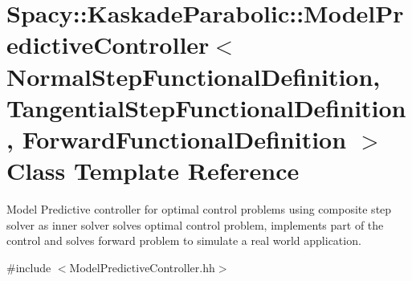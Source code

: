 \hypertarget{classSpacy_1_1KaskadeParabolic_1_1ModelPredictiveController}{\section{Spacy\-:\-:Kaskade\-Parabolic\-:\-:Model\-Predictive\-Controller$<$ Normal\-Step\-Functional\-Definition, Tangential\-Step\-Functional\-Definition, Forward\-Functional\-Definition $>$ Class Template Reference}
\label{classSpacy_1_1KaskadeParabolic_1_1ModelPredictiveController}
}


Model Predictive controller for optimal control problems using composite step solver as inner solver solves optimal control problem, implements part of the control and solves forward problem to simulate a real world application.  




{\ttfamily \#include $<$Model\-Predictive\-Controller.\-hh$>$}

